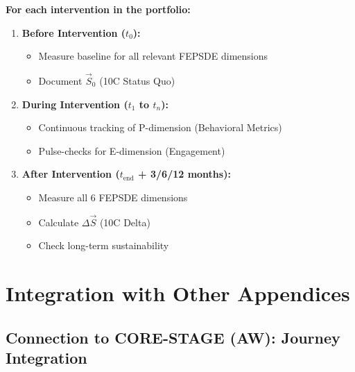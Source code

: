 \begin{tcolorbox}[colback=blue!5!white, colframe=blue!75!black,
    title=\textbf{The 3$\times$3 KPI Protocol}]

\textbf{For each intervention in the portfolio:}

\begin{enumerate}
\item \textbf{Before Intervention ($t_0$):}
   \begin{itemize}[nosep]
   \item Measure baseline for all relevant FEPSDE dimensions
   \item Document $\vec{S}_0$ (10C Status Quo)
   \end{itemize}

\item \textbf{During Intervention ($t_1$ to $t_n$):}
   \begin{itemize}[nosep]
   \item Continuous tracking of P-dimension (Behavioral Metrics)
   \item Pulse-checks for E-dimension (Engagement)
   \end{itemize}

\item \textbf{After Intervention ($t_{\text{end}}$ + 3/6/12 months):}
   \begin{itemize}[nosep]
   \item Measure all 6 FEPSDE dimensions
   \item Calculate $\Delta\vec{S}$ (10C Delta)
   \item Check long-term sustainability
   \end{itemize}
\end{enumerate}

\end{tcolorbox}


\section{Integration with Other Appendices}
\label{sec:hhh-integration}

\subsection{Connection to CORE-STAGE (AW): Journey Integration}

